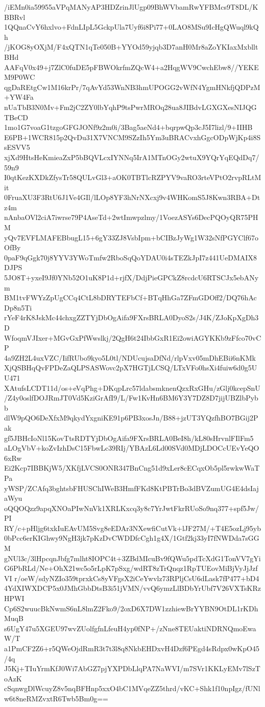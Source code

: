 /iEMn0ia59955aVPqMANyAP3HDZrinJlUgp09BhWVbamRwYFBMcs9T8DL/KBBRvl
1QQnaCvY6hxlvo+FdnLIpL5GckpUla7Uyf6i8Pi77+0LAO8MSu9IcHgQWuql9kQh
/jKOG8yOXjM/F4xQTN1qTe050B+YYOd59yjqb3D7anH0Mr8aZoYKIaxMxblltBHd
AAFqV0x49+j7ZlC0fuDE5pFBWOkrfmZQcW4+a2HqgWV9CwchEbw8//YEKEM9P0WC
qgDaREtgCw1M16krPr/7qAvYd53WnNB3hmUPOGG2vWfN4YgmHNkfjQDPzM+YW4Fa
nUaTbB3N0Mv+Fm2jC2ZY0lbYqhP9tsPwrMROq28ua8JIBdvLGXGXesNIJQGTBeCD
1mo1G7voaG1tzgoGFGJONf9z2m0i/3Bag5aeNd4+bqrpwQp3cJ5I7lizl/9+IIHB
E6PB+1WCR815p2QvDu31X7VNCM9SZzIh5Ym3uBRACvxhGgcODpWjKp4i8SsESVV5
xjXd9HtsHeKmieaZxP5bBQVLcxIYNNq5IrA1MTnOGy2wtuX9YQrYqEQdDq7/59n9
I0qtKezKXDkZfysTr58QULvGl3+aOK0TBTlcRZPYV9vaRO3rteVPtO2rvpRLtMit
0FruaXU3F3RtU6J1Ve4GIl/lLOp8YF3hNrNXcxj9v4WHKomS5J8Kwn3RBA+Dtz4m
nAnbaOVl2ciA7iwrse79P4AseTd+2wtImwpzlmy/1VoezASYs6DecPQOyQR75PHM
yQv7EVFLMAFEBbugL15+6gY33ZJ8VsbIpm+bCIBzJyWg1W32sNfPGYClf67oOfBy
0paF9qGgk70j8YYV3YWoTmfw2RboSqQoYDAU0i4sTEZkJpI7z441UeDMAIX8DJPS
5JO8T+yxeI9Jf0YNb52O1uK8P1d+rjfX/DdjPieGPCkZ8rcdcU6RTSCJx5ebANym
BM1tvFWYzZpUgCCq4CtL8bDRYTEFbCf+BTqHhGa7ZFmGDOff2/DQ76hAcDp8n5Ti
rYeF4rK8JskMc44chxgZZTYjDbOgAifa9FXrsBRLA0DyoS2s/J4K/ZJoKpXgDh3D
WfoqmVJIxer+MGvGxPfWwslkj/2QgH6t24IbbGxR1Ei2owiAGYKKb9zFfco70vCP
4a9ZH2L4uxVZC/IifRUbo9kyo5L0tl/NDUcujsaDfNd/rlpVxv05mDhEBii6nKMk
XjQSBHqQvFPDeZaQLPSASWovc2pX7HGTjLCSQ/LTxVFo0hsXi4fuiw6d0g5UU471
XAtufsLCDT11d/os+eVqPhg+DKqpLrc57ldabsmknenQzxRxGHu/zGlj0kcepSnU
/Z4y0oslfDOJRmJT0Vd5KziGrAfI9/L/Fw1KvHn6BM6Y3Y7DZ8D7jijUBZlbPybb
dlW9pQO6DeXfxM9qkydYxgniKE91p6PB3xosJn/B88+jzUT3YQzfhBO7BGij2Pak
gf5JBHcIoNl15KovTtsRDTYjDbOgAifa9FXrsBRLA0BeI8h/kL80sHrvnlFIlFm5
aLOgVbV+koZvIzhDsC15FbwLc39RIj/YBAzL6Ld00SVd0MDjLDOCcUEvYeQO6xRw
Ei2Kcp7IBBKjW5/XKfjLVCS0ONR347BnCng51d9xLer8cECqxOb5pl5rwkwWaTPa
yWSP/ZCAfq3bghtsbFHUSChIWeB3HmfFKd8KtPBTrBo3dBVZumUG4E4dsIajaWyu
oQQOQzz9apqXNOaPIwNnVk1XRLKxcq3y8c7YrJwtFkrRUoSo9nq377+spf5Jw/PI
RY/c+pHljg6txkIuEAvUM5Svg8eEDAr3NXewfiCutVk+lJF27M/+T4E5ozLj95yb
0bPcc6erKIGhwy9NgH3jk7pKzDvCWDDfcCgh1g4X/1Gtf2kj33yI7fNWDda7sGGM
gNUl3c/3lHpcqnJbfg7mlht8IOPC4t+3ZBdMIcuBv9fQWu5pdTcXdG1TonVV7gYi
G6PbRLd/Ne+OhX21wc5o5rLpK7pSxg/wdRT8zTrQnqz1RpTUEovMiBjVyJjJzfVI
r/oeW/sdyNZIo359tprxkCs8yVFgsX2iCeYwvlz73RPljCsU6dLask7fP477+bD4
4YdXIWXDCP5x0JMhGbbDtsB3i51jVMN/vvQ6ymzLlBDbYrUbf7V26VXTsKRzHPWI
Cp6S2wuucBkNwmS6nL8lmZ2Fko9/2oxD6X7DW1zzhiewBrYYBN9OtDL1rKDhMuqB
s6UgY47u5XGEU97wvZUolfgfnLfeuH4yp0fNP+/zNne8TEUaktiNDRNQmoEwaW/T
a1PmCF2Z6+r5QWeOjdRmR3t7t3l8q8NkbEHDxvH4Dzf6PEgd4sRdpx0wKpO45/4q
J5Kj+TIuYrmKfJ0Wi7AbGZ7pjYXPDbLlqPA7NaWVI/m7SVr1KKLyEMv7lSzToAzK
cSqnwgDlWcuyZ8v5nqBFHnp5xxO4bC1MVqeZZ5thrd/vKC+Shk1f10npIgz/fUNl
w6t8neRMZvxtR6Twb5Bm0g==
